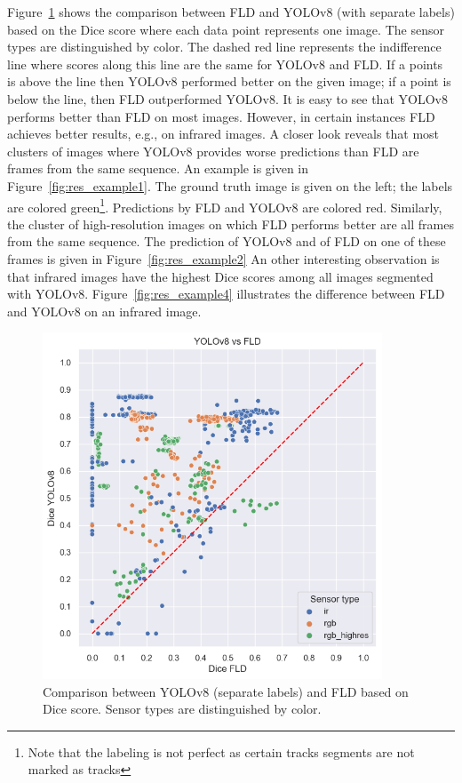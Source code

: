 \documentclass[Master,MDS,english]{BASE/twbook} %
\begin{document}
Figure~\ref{fig:yolo_vs_fld} shows the comparison between FLD and YOLOv8 (with separate labels) based on the Dice score where each data point represents one image. The sensor types are distinguished by color. The dashed red line represents the indifference line where scores along this line are the same for YOLOv8 and FLD. If a points is above the line then YOLOv8 performed better on the given image; if a point is below the line, then FLD outperformed YOLOv8. It is easy to see that YOLOv8 performs better than FLD on most images. However, in certain instances FLD achieves better results, e.g., on infrared images. A closer look reveals that most clusters of images where YOLOv8 provides worse predictions than FLD are frames from the same sequence. 
An example is given in Figure~\ref{fig:res_example1}. The ground truth image is given on the left; the labels are colored green\footnote{Note that the labeling is not perfect as certain tracks segments are not marked as tracks}. Predictions by FLD and YOLOv8 are colored red. 
Similarly, the cluster of high-resolution images on which FLD performs better are all frames from the same sequence. The prediction of YOLOv8 and of FLD on one of these frames is given in Figure~\ref{fig:res_example2}
An other interesting observation is that infrared images have the highest Dice scores among all images segmented with YOLOv8. Figure~\ref{fig:res_example4} illustrates the difference between FLD and YOLOv8 on an infrared image.



\begin{figure}[h]
\centering
\includegraphics[width=0.9\textwidth]{images/results/dice_fld_vs_yolo_nl}
\caption{Comparison between YOLOv8 (separate labels) and FLD based on Dice score. Sensor types are distinguished by color. }
\label{fig:yolo_vs_fld}
\end{figure}
\end{document}
